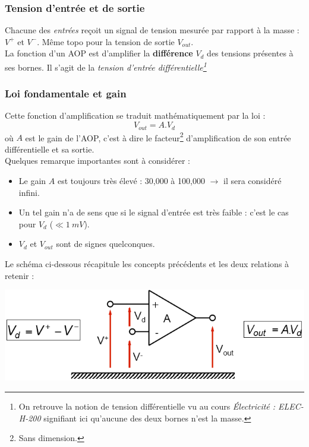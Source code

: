\documentclass	[11pt, a4paper, openany]{book}
\begin{document}
\subsubsection{Tension d'entrée et de sortie}
Chacune des \textit{entrées} reçoit un signal de tension mesurée par rapport à la masse : $V^+$ et $V^-$. Même topo pour la tension de sortie $V_{out}$.\\
La fonction d'un AOP est d'amplifier la \textbf{différence} $V_d$ des tensions présentes à ses bornes. Il s'agit de la \textit{tension d'entrée différentielle\footnote{On retrouve la notion de tension différentielle vu au cours \textit{Électricité : ELEC-H-200} signifiant ici qu'aucune des deux bornes n'est la masse.}}

\subsubsection{Loi fondamentale et gain}
Cette fonction d'amplification se traduit mathématiquement par la loi : 
\begin{equation}
V_{out} = A.V_d
\end{equation}
où $A$ est le gain de l'AOP, c'est à dire le facteur\footnote{Sans dimension.} d'amplification de son entrée différentielle et sa sortie.\\
Quelques remarque importantes sont à considérer :
\begin{itemize}
\item Le gain $A$ est toujours très élevé : 30,000 à 100,000 $\rightarrow$ il sera considéré infini.
\item Un tel gain n'a de sens que si le signal d'entrée est très faible : c'est le cas pour $V_d$ ($\ll 1\ mV$).
\item $V_d$ et $V_{out}$ sont de signes quelconques.
\end{itemize}
Le schéma ci-dessous récapitule les concepts précédents et les deux relations à retenir :
\begin{center}
\includegraphics[scale=0.5]{img/image39}
\end{center}
\end{document}
